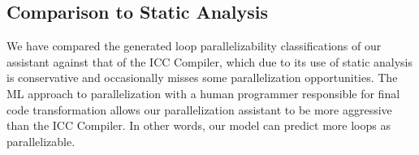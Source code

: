 \subsection{Comparison to Static Analysis} 
\quad We have compared the generated loop parallelizability classifications of our assistant against that of the ICC Compiler, which due to its use of static analysis is conservative and occasionally misses some parallelization opportunities. The ML approach to parallelization with a human programmer responsible for final code transformation allows our parallelization assistant to be more aggressive than the ICC Compiler. In other words, our model can predict more loops as parallelizable. 

